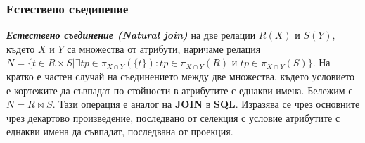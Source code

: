 \documentclass[fleqn,12pt]{article}
\begin{document}
\subsubsection{Естествено съединение}
\textbf{\textit{Естествено съединение (Natural join)}} на две релации $R(X)$ и $S(Y)$, където $X$ и $Y$ са множества от атрибути, наричаме релация $N = \{t \in R \times S | \exists tp \in \pi_{X \cap Y}(\{t\}): tp \in \pi_{X \cap Y}(R)$ и $tp \in \pi_{X \cap Y}(S)\}$.
На кратко е частен случай на съединението между две множества, където условието е кортежите да съвпадат по стойности в атрибутите с еднакви имена.
\bigbreak
Бележим с $N = R \bowtie S$. Тази операция е аналог на \textbf{JOIN} в \textbf{SQL}. Изразява се чрез основните чрез декартово произведение, 
последвано от селекция с условие атрибутите с еднакви имена да съвпадат, последвана от проекция.
\end{document}
